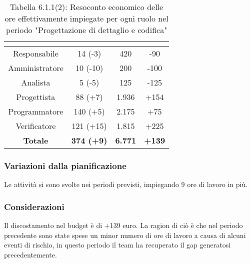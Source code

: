 \renewcommand{\arraystretch}{1.4}
\begin{table}[H]
\begin{center}
\begin{tabular}{|c|c|c|c|}
\hline
\rowcolor{title_row}
\textbf{\color{title_text}{Ruolo}}  & \textbf{\color{title_text}{Ore}} & \textbf{\color{title_text}{Costo in \euro}} & \textbf{\color{title_text}{Differenza al preventivo in \euro}} \\ \hline
Responsabile    & 14 (-3) & 420 & -90\\  \hline
Amministratore  & 10 (-10)& 200 & -100 \\ \hline
Analista        & 5 (-5) & 125 & -125 \\ \hline
Progettista     & 88 (+7) & 1.936 & +154\\ \hline
Programmatore   & 140 (+5) & 2.175 & +75\\ \hline
Verificatore    & 121 (+15) & 1.815& +225\\ \hline
\textbf{Totale} & \textbf{374 (+9)}    & \textbf{6.771} & \textbf{+139} \\ \hline
\end{tabular}
\caption{Tabella 6.1.1(2): Resoconto economico delle ore effettivamente impiegate per ogni ruolo nel periodo "Progettazione di dettaglio e codifica"\label{}}
\end{center}
\end{table}
\renewcommand{\arraystretch}{1}


\subsubsection{Variazioni dalla pianificazione}
Le attività si sono svolte nei periodi previsti, impiegando 9 ore di lavoro in più.

\subsubsection{Considerazioni}
Il discostamento nel budget è di +139 euro. La ragion di ciò è che nel periodo precedente sono state spese un minor numero di ore di lavoro a causa di alcuni eventi di rischio, in questo periodo il team ha recuperato il gap generatosi precedentemente. 

\pagebreak
